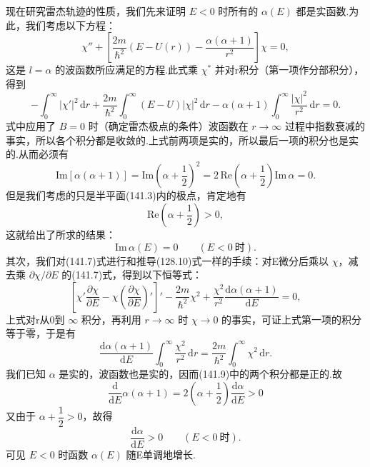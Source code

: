 现在研究雷杰轨迹的性质，我们先来证明 $E<0$ 时所有的 $\alpha(E)$ 都是实函数.为此，我们考虑以下方程：
\begin{equation}
  \chi''+\left[\frac{2m}{\hbar^2}\left(E-U(r)\right)
  -\frac{\alpha(\alpha+1)}{r^2}\right]\chi=0,
\end{equation}
这是 $l=\alpha$ 的波函数所应满足的方程.此式乘 $\chi^{*}$ 并对r积分（第一项作分部积分），得到
\begin{equation*}
  -\int_0^{\infty}|\chi'|^2\,\mathrm{d}r
  +\frac{2m}{\hbar^2}\int_0^{\infty}(E-U)|\chi|^2\,\mathrm{d}r
  -\alpha(\alpha+1)\int_0^{\infty}\frac{|\chi|^2}{r^2}\,\mathrm{d}r=0.
\end{equation*}
式中应用了 $B=0$ 时（确定雷杰极点的条件）波函数在 $r\to\infty$ 过程中指数衰减的事实，所以各个积分都是收敛的.上式前两项是实的，所以最后一项的积分也是实的.从而必须有
\begin{equation*}
  \mathrm{Im}\left[\alpha(\alpha+1)\right]
  =\mathrm{Im}\left(\alpha+\frac{1}{2}\right)^{2}
  =2\,\mathrm{Re}\left(\alpha+\frac{1}{2}\right)\mathrm{Im}\,\alpha=0.
\end{equation*}
但是我们考虑的只是半平面(141.3)内的极点，肯定地有
\begin{equation*}
  \mathrm{Re}\left(\alpha+\frac{1}{2}\right)>0,
\end{equation*}
这就给出了所求的结果：
\begin{equation}
  \mathrm{Im}\,\alpha(E)=0\qquad(E<0\ \text{时}).
\end{equation}
其次，我们对(141.7)式进行和推导(128.10)式一样的手续：对E微分后乘以 $\chi$，减去乘 $\partial\chi/\partial E$ 的(141.7)式，得到以下恒等式：
\begin{equation*}
  \left[\chi'\frac{\partial\chi}{\partial E}
  -\chi\left(\frac{\partial\chi}{\partial E}\right)'\right]'
  -\frac{2m}{\hbar^2}\chi^2
  +\frac{\chi^2}{r^2}\frac{\mathrm{d}\alpha(\alpha+1)}{\mathrm{d}E}=0,
\end{equation*}
上式对r从0到 $\infty$ 积分，再利用 $r\to\infty$ 时 $\chi\to0$ 的事实，可证上式第一项的积分等于零，于是有
\begin{equation}
  \frac{\mathrm{d}\alpha(\alpha+1)}{\mathrm{d}E}
  \int_0^{\infty}\frac{\chi^2}{r^2}\,\mathrm{d}r
  =\frac{2m}{\hbar^2}\int_0^{\infty}\chi^2\,\mathrm{d}r.
\end{equation}
我们已知 $\alpha$ 是实的，波函数也是实的，因而(141.9)中的两个积分都是正的.故
\begin{equation*}
  \frac{\mathrm{d}}{\mathrm{d}E}\alpha(\alpha+1)
  =2\left(\alpha+\frac{1}{2}\right)\frac{\mathrm{d}\alpha}{\mathrm{d}E}>0
\end{equation*}
又由于 $\alpha+\dfrac{1}{2}>0$，故得
\begin{equation*}
  \frac{\mathrm{d}\alpha}{\mathrm{d}E}>0
  \qquad(E<0\ \text{时}).
\end{equation*}
可见 $E<0$ 时函数 $\alpha(E)$ 随E单调地增长.

